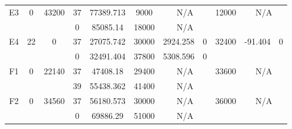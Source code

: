 \begin{sidewaystable}
\begin{tabular}{c||c|c||c|c|c|c|c||c|c|c}
         &
        
      \\
      \hline
      \multirow{2}{*}{E3} &
      \multirow{2}{*}{0} &
      \multirow{2}{*}{43200} &
      37 &
      77389.713 &
      9000 &
        \multicolumn{2}{|c||}{N/A} &
      \multirow{2}{*}{12000} &
        \multicolumn{2}{c}{\multirow{2}{*}{N/A}}
      \\
      \cline{4-8}
       &
       &
       &
      0 &
      85085.14 &
      18000 &
        \multicolumn{2}{|c||}{N/A} &
      
        
      \\
      \hline
      \multirow{2}{*}{E4} &
      \multirow{2}{*}{22} &
      \multirow{2}{*}{0} &
      37 &
      27075.742 &
      30000 &
        2924.258 &
        0 &
      \multirow{2}{*}{32400} &
        \multirow{2}{*}{-91.404} &
        \multirow{2}{*}{0}
      \\
      \cline{4-8}
       &
       &
       &
      0 &
      32491.404 &
      37800 &
        5308.596 &
        0 &
      
         &
        
      \\
      \hline
      \multirow{2}{*}{F1} &
      \multirow{2}{*}{0} &
      \multirow{2}{*}{22140} &
      37 &
      47408.18 &
      29400 &
        \multicolumn{2}{|c||}{N/A} &
      \multirow{2}{*}{33600} &
        \multicolumn{2}{c}{\multirow{2}{*}{N/A}}
      \\
      \cline{4-8}
       &
       &
       &
      39 &
      55438.362 &
      41400 &
        \multicolumn{2}{|c||}{N/A} &
      
        
      \\
      \hline
      \multirow{2}{*}{F2} &
      \multirow{2}{*}{0} &
      \multirow{2}{*}{34560} &
      37 &
      56180.573 &
      30000 &
        \multicolumn{2}{|c||}{N/A} &
      \multirow{2}{*}{36000} &
        \multicolumn{2}{c}{\multirow{2}{*}{N/A}}
      \\
      \cline{4-8}
       &
       &
       &
      0 &
      69886.29 &
      51000 &
        \multicolumn{2}{|c||}{N/A} &
      
        
      \\
\end{tabular}
\label{table:RDS2-8097.tex} 
\end{sidewaystable}